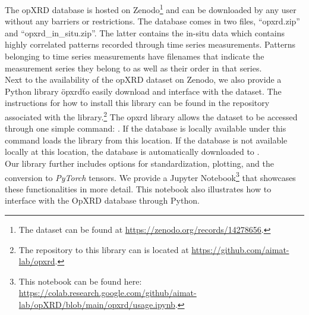The opXRD database is hosted on Zenodo\footnote{The dataset can be found at \url{https://zenodo.org/records/14278656}.} and can be downloaded by any user without any barriers or restrictions. The database comes in two files, ``opxrd.zip'' and ``opxrd\_in\_situ.zip''. The latter contains the in-situ data which contains highly correlated patterns recorded through time series measurements. Patterns belonging to time series measurements have filenames that indicate the measurement series they belong to as well as their order in that series. \\

Next to the availability of the opXRD dataset on Zenodo, we also provide a Python library \"opxrd\" to easily download and interface with the dataset. The instructions for how to install this library can be found in the repository associated with the library.\footnote{The repository to this library can is located at \url{https://github.com/aimat-lab/opxrd}.} The opxrd library allows the dataset to be accessed through one simple command: . If the database is locally available under  this command loads the library from this location. If the database is not available locally at this location, the database is automatically downloaded to . \\

Our library further includes options for standardization, plotting, and the conversion to \emph{PyTorch} tensors. We provide a Jupyter Notebook\footnote{This notebook can be found here: \url{https://colab.research.google.com/github/aimat-lab/opXRD/blob/main/opxrd/usage.ipynb}.} that showcases these functionalities in more detail. This notebook also illustrates how to interface with the OpXRD database through Python. 